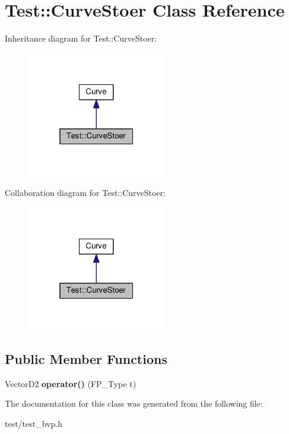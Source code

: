 \hypertarget{classTest_1_1CurveStoer}{}\section{Test\+:\+:Curve\+Stoer Class Reference}
\label{classTest_1_1CurveStoer}


Inheritance diagram for Test\+:\+:Curve\+Stoer\+:
\nopagebreak
\begin{figure}[H]
\begin{center}
\leavevmode
\includegraphics[width=172pt]{classTest_1_1CurveStoer__inherit__graph}
\end{center}
\end{figure}


Collaboration diagram for Test\+:\+:Curve\+Stoer\+:
\nopagebreak
\begin{figure}[H]
\begin{center}
\leavevmode
\includegraphics[width=172pt]{classTest_1_1CurveStoer__coll__graph}
\end{center}
\end{figure}
\subsection*{Public Member Functions}
\begin{DoxyCompactItemize}
\item 
\mbox{\label{classTest_1_1CurveStoer_a26d8d77360d605f266f1b2ef9ad9e824}} 
Vector\+D2 {\bfseries operator()} (F\+P\+\_\+\+Type t)
\end{DoxyCompactItemize}


The documentation for this class was generated from the following file\+:\begin{DoxyCompactItemize}
\item 
test/test\+\_\+bvp.\+h\end{DoxyCompactItemize}
